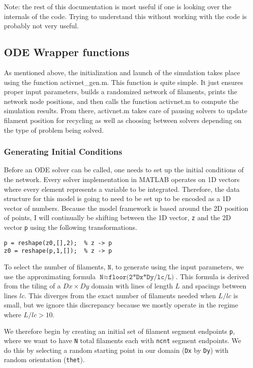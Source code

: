 Note: the rest of this documentation is most useful if one is looking over the internals of the code.  Trying to understand this without working with the code is probably not very useful.

\subsection{ODE Wrapper functions }

As mentioned above, the initialization and launch of the simulation takes place using the function activnet\_gen.m.  This function is quite simple. It just ensures proper input parameters, builds a randomized network of filaments, prints the network node positions, and then calls the function activnet.m to compute the simulation results.  From there, activnet.m takes care of pausing solvers to update filament position for recycling as well as choosing between solvers depending on the type of problem being solved.  

\subsubsection{Generating Initial Conditions}

Before an ODE solver can be called, one needs to set up the initial conditions of the network.  Every solver implementation in MATLAB operates on 1D vectors where every element represents a variable to be integrated.  Therefore, the data structure for this model is going to need to be set up to be encoded as a 1D vector of numbers.  Because the model framework is based around the 2D position of points, I will continually be shifting between the 1D vector, \texttt{z} and the 2D vector \texttt{p} using the following transformations.

\begin{verbatim}
p = reshape(z0,[],2);  % z -> p
z0 = reshape(p,1,[]);  % z -> p
\end{verbatim}

To select the number of filaments, $\texttt{N}$, to generate using the input parameters, we use the approximating formula $\texttt{N} \approx \texttt{floor(2*Dx*Dy/lc/L)}$.  This formula is derived from the tiling of a $Dx \times Dy$ domain with lines of length $L$ and spacings between lines $lc$.  This diverges from the exact number of filaments needed when $L/lc$ is small, but we ignore this discrepancy because we mostly operate in the regime where $L/lc>10$.

We therefore begin by creating an initial set of filament segment endpoints \texttt{p}, where we want to have \texttt{N} total filaments each with \texttt{ncnt} segment endpoints.  We do this by selecting a random starting point in our domain (\texttt{Dx} by \texttt{Dy}) with random orientation (\texttt{thet}).

